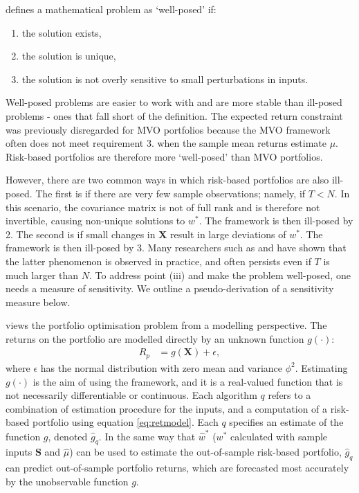 \documentclass[
]{article}
\providecommand{\tightlist}{%
  \setlength{\itemsep}{0pt}\setlength{\parskip}{0pt}}
\begin{document}
\citet{H23} defines a mathematical problem as `well-posed' if:

\begin{enumerate}
\def\labelenumi{\arabic{enumi}.}
\tightlist
\item
  the solution exists,
\item
  the solution is unique,
\item
  the solution is not overly sensitive to small perturbations in inputs.
\end{enumerate}

Well-posed problems are easier to work with and are more stable than ill-posed problems - ones that
fall short of the definition. The expected return constraint was previously disregarded for MVO
portfolios because the MVO framework often does not meet requirement 3. when the sample mean returns
estimate \(\mu\). Risk-based portfolios are therefore more `well-posed' than MVO portfolios.

However, there are two common ways in which risk-based portfolios are also ill-posed. The first is if
there are very few sample observations; namely, if \(T < N\). In this scenario, the covariance matrix
is not of full rank and is therefore not invertible, causing non-unique solutions to \(w^*\). The
framework is then ill-posed by 2. The second is if small changes in \(\textbf{X}\) result in large
deviations of \(w^*\). The framework is then ill-posed by 3. Many researchers such as \citet{JK81}
and \citet{B91} have shown that the latter phenomenon is observed in practice, and often persists even
if \(T\) is much larger than \(N\). To address point (iii) and make the problem well-posed, one needs a
measure of sensitivity. We outline a pseudo-derivation of a sensitivity measure below.

\citet{K18} views the portfolio optimisation problem from a modelling perspective. The returns on the
portfolio are modelled directly by an unknown function \(g(\cdot)\):
\begin{align}
R_p & = g(\textbf{X}) + \epsilon, \label{eq:retmodel}
\end{align}
where \(\epsilon\) has the normal distribution with zero mean and variance \(\phi^2\). Estimating
\(g(\cdot)\) is the aim of using the framework, and it is a real-valued function that is not
necessarily differentiable or continuous. Each algorithm \(q\) refers to a combination of estimation
procedure for the inputs, and a computation of a risk-based portfolio using equation
\eqref{eq:retmodel}. Each \(q\) specifies an estimate of the function \(g\), denoted \(\hat{g}_q\). In the
same way that \(\hat{w}^*\) (\(w^*\) calculated with sample inputs \(\textbf{S}\) and \(\hat{\mu}\)) can be
used to estimate the out-of-sample risk-based portfolio, \(\hat{g}_q\) can predict out-of-sample
portfolio returns, which are forecasted most accurately by the unobservable function \(g\).
\end{document}
